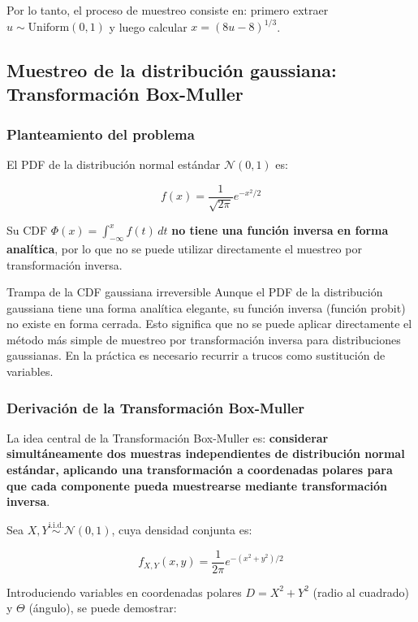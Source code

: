 \documentclass[a4paper]{article}
\begin{document}
Por lo tanto, el proceso de muestreo consiste en: primero extraer $u \sim \text{Uniform}(0,1)$ y luego calcular $x = (8u - 8)^{1/3}$.

\subsection{Muestreo de la distribución gaussiana: Transformación Box-Muller}

\subsubsection{Planteamiento del problema}

El PDF de la distribución normal estándar $\mathcal{N}(0, 1)$ es:

$$f(x) = \frac{1}{\sqrt{2\pi}} e^{-x^2/2}$$

Su CDF $\Phi(x) = \int_{-\infty}^{x} f(t) \, dt$ \textbf{no tiene una función inversa en forma analítica}, por lo que no se puede utilizar directamente el muestreo por transformación inversa.

\begin{warningbox}{Trampa de la CDF gaussiana irreversible}
Aunque el PDF de la distribución gaussiana tiene una forma analítica elegante, su función inversa (función probit) no existe en forma cerrada. Esto significa que no se puede aplicar directamente el método más simple de muestreo por transformación inversa para distribuciones gaussianas. En la práctica es necesario recurrir a trucos como sustitución de variables.
\end{warningbox}

\subsubsection{Derivación de la Transformación Box-Muller}

La idea central de la Transformación Box-Muller es: \textbf{considerar simultáneamente dos muestras independientes de distribución normal estándar, aplicando una transformación a coordenadas polares para que cada componente pueda muestrearse mediante transformación inversa}.

Sea $X, Y \overset{\text{i.i.d.}}{\sim} \mathcal{N}(0, 1)$, cuya densidad conjunta es:

$$f_{X,Y}(x, y) = \frac{1}{2\pi} e^{-(x^2 + y^2)/2}$$

Introduciendo variables en coordenadas polares $D = X^2 + Y^2$ (radio al cuadrado) y $\Theta$ (ángulo), se puede demostrar:
\end{document}
